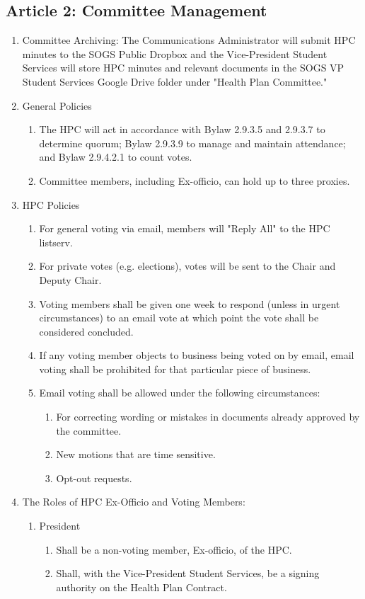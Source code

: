 \subsection{Article 2: Committee Management}
\begin{enumerate} [label*=\arabic*., align=left]	
\item Committee Archiving: The Communications Administrator will submit HPC minutes to the SOGS Public
Dropbox and the Vice-President Student Services will store HPC minutes and relevant documents in the SOGS VP Student Services Google Drive folder under "Health Plan Committee."
\item General Policies
\begin{enumerate} [label*=\arabic*., align=left]	
\item The HPC will act in accordance with Bylaw 2.9.3.5 and 2.9.3.7 to determine quorum; Bylaw 2.9.3.9 to manage and maintain attendance; and Bylaw 2.9.4.2.1 to count votes.
\item Committee members, including Ex-officio, can hold up to three proxies.
\end{enumerate}
\item HPC Policies
\begin{enumerate} [label*=\arabic*., align=left]	
\item For general voting via email, members will "Reply All" to the HPC listserv.
\item For private votes (e.g. elections), votes will be sent to the Chair and Deputy Chair.
\item Voting members shall be given one week to respond (unless in urgent circumstances) to
an email vote at which point the vote shall be considered concluded.
\item If any voting member objects to business being voted on by email, email voting shall be
prohibited for that particular piece of business.
\item Email voting shall be allowed under the following circumstances:
\begin{enumerate} [align=left]	
\item For correcting wording or mistakes in documents already approved by the committee. 
\item New motions that are time sensitive.
\item Opt-out requests.
\end{enumerate}
\end{enumerate}
\item The Roles of HPC Ex-Officio and Voting Members:
\begin{enumerate} [label*=\arabic*., align=left]	
\item President
\begin{enumerate}
\item Shall be a non-voting member, Ex-officio, of the HPC.
\item Shall, with the Vice-President Student Services, be a signing authority on the Health Plan Contract.
\end{enumerate}


\end{enumerate}
\end{enumerate}

